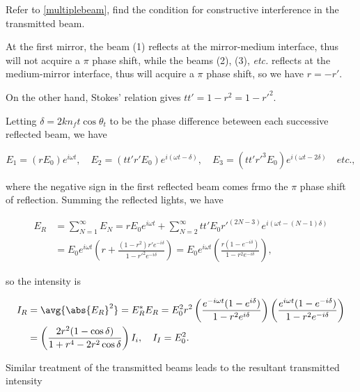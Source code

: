 \documentclass[english,a4paper,12pt]{report}
\begin{document}
{Refer to \cref{multiplebeam}, find the condition for constructive interference in the transmitted beam. }
{At the first mirror, the beam (1) reflects at the mirror-medium interface, thus will not acquire a \(\pi \) phase shift, while the beams (2), (3), \textit{etc.} reflects at the medium-mirror interface, thus will acquire a \(\pi \) phase shift, so we have \(r = -r'\).

On the other hand, Stokes' relation gives \(t t' = 1-r^2 = 1-{r'}^2\). 

Letting \(\delta = 2kn_{f}t\cos \theta _{t}  \) to be the phase difference beteween each successive reflected beam, we have

\begin{equation}
    E_1 = (rE_0 )e^{i\omega t}, \quad E_2 = (t t'r'E_0 )e^{i(\omega t-\delta )}, \quad E_3 = (t t'{r'}^3 E_0 )e^{i(\omega t-2\delta )} \quad  \textit{etc.}, 
\end{equation}

where the negative sign in the first reflected beam comes frmo the \(\pi \) phase shift of reflection. Summing the reflected lights, we have

\begin{equation}
    \begin{aligned} 
    E_{R} &= \sum_{N=1}^{\infty} E_{N} = rE_0 e^{i \omega t} + \sum_{N=2}^{\infty} tt' E_0 {r'}^{(2N-3)} e^{i(\omega t - (N-1)\delta )} \\
    &= E_0 e^{i \omega t}\left( r+ \frac{(1-r^2)r'e^{-i\delta } }{1-{r'}^2e^{-i \delta } }  \right) = E_0 e^{i\omega t}\left( \frac{r(1- e^{-i \delta } )}{1-r^2e^{-i \delta } }  \right),    
    \end{aligned} 
\end{equation}

so the intensity is 

\begin{equation}
    \begin{aligned} 
    I_{R} &= \avg{\abs{E_{R} }^2 } = E_{R}^*E_{R} = E_0 ^2r^2\left( \frac{e^{-i \omega t} (1-e^{i \delta } )}{1-r^2e^{i \delta } }  \right) \left( \frac{e^{i \omega t} (1- e^{-i \delta })}{1-r^2e^{-i \delta } }  \right) \\
    &= \left( \frac{2r^2(1-\cos \delta )}{1+r^{4}-2r^2\cos \delta  }  \right)I_{i}, \quad I_{I} = E_0 ^2.    
    \end{aligned} 
\end{equation}

Similar treatment of the transmitted beams leads to the resultant transmitted intensity 

}
\end{document}
